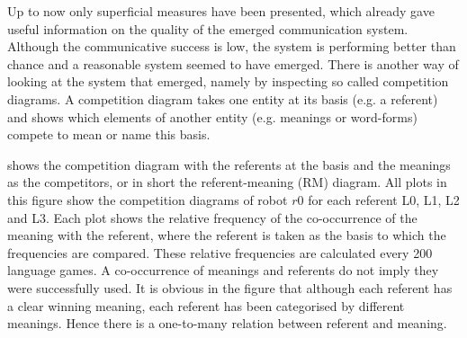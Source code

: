 Up to now only superficial measures have been presented, which already gave useful information on the quality of the emerged communication system. Although the communicative success is low, the system is performing better than chance and a reasonable system seemed to have emerged. There is another way of looking at the system that emerged, namely by inspecting so called {\sc competition diagrams}. A competition diagram takes one entity at its basis (e.g. a referent) and shows which elements of another entity (e.g. meanings or word-forms) compete to mean or name this basis.


 shows the competition diagram with the referents at the basis and the meanings as the competitors, or in short the referent-meaning (RM) diagram. All plots in this figure show the competition diagrams of robot $r0$ for each referent L0, L1, L2 and L3. Each plot shows the relative frequency of the co-occurrence of the meaning with the referent, where the referent is taken as the basis to which the frequencies are compared. These relative frequencies are calculated every 200 language games. A co-occurrence of meanings and referents do not imply they were successfully used. It is obvious in the figure that although each referent has a clear winning meaning, each referent has been categorised by different meanings. Hence there is a one-to-many relation between referent and meaning.

